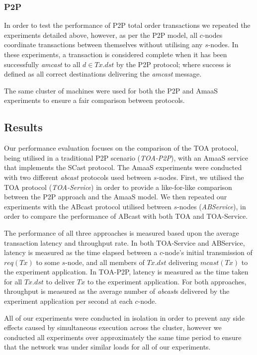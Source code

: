 	\subsubsection*{P2P}
	In order to test the performance of P2P total order transactions we repeated the experiments detailed above, however, as per the P2P model, all $c$-nodes coordinate transactions between themselves without utilising any $s$-nodes.  In these experiments, a transaction is considered complete when it has been successfully \emph{amcast} to all $d \in Tx.dst$ by the P2P protocol; where success is defined as all correct destinations delivering the \emph{amcast} message. 
	
	The same cluster of machines were used for both the P2P and \textsf{AmaaS} experiments to ensure a fair comparison between protocols.   
	
	\subsection{Results}\label{sec:AmaaS_results}
	Our performance evaluation focuses on the comparison of the TOA protocol, being utilised in a traditional P2P scenario (\emph{TOA-P2P}), with an \textsf{AmaaS} service that implements the \textsf{SCast} protocol.  The \textsf{AmaaS} experiments were conducted with two different \emph{abcast} protocols used between $s$-nodes.  First, we utilised the TOA protocol (\emph{TOA-Service}) in order to provide a like-for-like comparison between the P2P approach and the \textsf{AmaaS} model. We then repeated our experiments with the \textsf{ABcast} protocol utilised between $s$-nodes (\emph{ABService}), in order to compare the performance of \textsf{ABcast} with both TOA and TOA-Service.  
    
    The performance of all three approaches is measured based upon the average transaction latency and throughput rate. In both TOA-Service and ABService, latency is measured as the time elapsed between a $c$-node's initial transmission of $req(Tx)$ to some $s$-node, and all members of $Tx.dst$ delivering $mcast(Tx)$ to the experiment application. In TOA-P2P, latency is measured as the time taken for all $Tx.dst$ to deliver $Tx$ to the experiment application. For both approaches, throughput is measured as the average number of \emph{abcast}s delivered by the experiment application per second at each $c$-node.
	
	All of our experiments were conducted in isolation in order to prevent any side effects caused by simultaneous execution across the cluster, however we conducted all experiments over approximately the same time period to ensure that the network was under similar loads for all of our experiments. 
	
